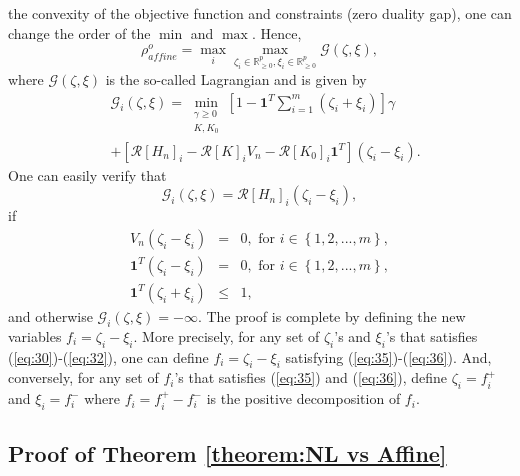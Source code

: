 \documentclass[letterpaper, 10 pt, conference]{ieeeconf}
\begin{document}
the convexity of the objective function and constraints (zero duality gap),
one can change the order of the $\min $ and $\max $. Hence,%
\begin{equation}
\rho _{affine}^{o}=\max_{i}\max_{\zeta _{i}\in \mathbb{R}_{\geq 0}^{p},\xi
_{i}\in \mathbb{R}_{\geq 0}^{p}}\mathcal{G}\left( \zeta ,\xi \right) ,
\label{eq:33}
\end{equation}%
where $\mathcal{G}\left( \zeta ,\xi \right) $ is the so-called Lagrangian
and is given by%
\begin{align*}
& \mathcal{G}_{i}\left( \zeta ,\xi \right) =\min_{\substack{ \gamma \geq 0 
\\ K,K_{0}}}\left[ 1-\mathbf{1}^{T}\sum_{i=1}^{m}\left( \zeta _{i}+\xi
_{i}\right) \right] \gamma \\
& +\left[ \mathcal{R}\left[ H_{n}\right] _{i}-\mathcal{R}\left[ K\right]
_{i}V_{n}-\mathcal{R}\left[ K_{0}\right] _{i}\mathbf{1}^{T}\right] \left(
\zeta _{i}-\xi _{i}\right) .
\end{align*}%
One can easily verify that 
\begin{equation}
\mathcal{G}_{i}\left( \zeta ,\xi \right) =\mathcal{R}\left[ H_{n}\right]
_{i}\left( \zeta _{i}-\xi _{i}\right) ,  \label{eq:34}
\end{equation}%
if 
\begin{eqnarray}
V_{n}\left( \zeta _{i}-\xi _{i}\right) &=&0,\text{ for }i\in \left\{
1,2,...,m\right\} ,  \label{eq:30} \\
\mathbf{1}^{T}\left( \zeta _{i}-\xi _{i}\right) &=&0,\text{ for }i\in
\left\{ 1,2,...,m\right\} ,  \label{eq:31} \\
\mathbf{1}^{T}\left( \zeta _{i}+\xi _{i}\right) &\leq &1,  \label{eq:32}
\end{eqnarray}%
and otherwise $\mathcal{G}_{i}\left( \zeta ,\xi \right) =-\infty $. The
proof is complete by defining the new variables $f_{i}=\zeta _{i}-\xi _{i}$.
More precisely, for any set of $\zeta _{i}$'s and $\xi _{i}$'s that
satisfies (\ref{eq:30})-(\ref{eq:32}), one can define $f_{i}=\zeta _{i}-\xi
_{i}$ satisfying (\ref{eq:35})-(\ref{eq:36}). And, conversely, for any set
of $f_{i}$'s that satisfies (\ref{eq:35}) and (\ref{eq:36}), define $\zeta
_{i}=f_{i}^{+}$ and $\xi _{i}=f_{i}^{-}$ where $f_{i}=f_{i}^{+}-f_{i}^{-}$
is the positive decomposition of $f_{i}$.

\subsection*{Proof of Theorem \protect\ref{theorem:NL vs Affine}}
\end{document}
